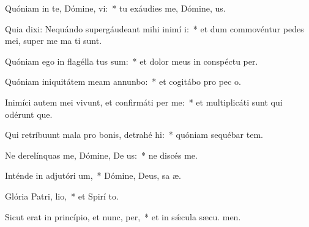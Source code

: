 \item Quóniam in te, Dómine, vi:~* tu exáudies me, Dómine,  us.
\item Quia dixi: Nequándo supergáudeant mihi inimí i:~* et dum commovéntur pedes mei, super me ma ti sunt.
\item Quóniam ego in flagélla tus sum:~* et dolor meus in conspéctu  per.
\item Quóniam iniquitátem meam annunbo:~* et cogitábo pro pec o.
\item Inimíci autem mei vivunt, et confirmáti  per me:~* et multiplicáti sunt qui odérunt  que.
\item Qui retríbuunt mala pro bonis, detrahé hi:~* quóniam sequébar tem.
\item Ne derelínquas me, Dómine, De us:~* ne discés  me.
\item Inténde in adjutóri um,~* Dómine, Deus, sa æ.
\item Glória Patri,  lio,~* et Spirí to.
\item Sicut erat in princípio, et nunc,  per,~* et in sǽcula sæcu. men.
